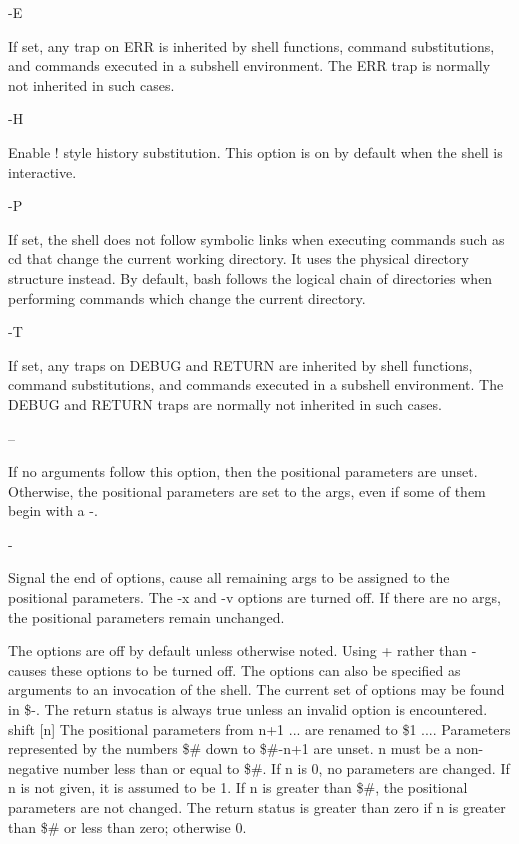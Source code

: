 -E

If set, any trap on ERR is inherited by shell functions, command substitutions, and commands executed in a subshell environment. The ERR trap is normally not inherited in such cases.

-H

Enable ! style history substitution. This option is on by default when the shell is interactive.

-P

If set, the shell does not follow symbolic links when executing commands such as cd that change the current working directory. It uses the physical directory structure instead. By default, bash follows the logical chain of directories when performing commands which change the current directory.

-T

If set, any traps on DEBUG and RETURN are inherited by shell functions, command substitutions, and commands executed in a subshell environment. The DEBUG and RETURN traps are normally not inherited in such cases.

--

If no arguments follow this option, then the positional parameters are unset. Otherwise, the positional parameters are set to the args, even if some of them begin with a -.

-

Signal the end of options, cause all remaining args to be assigned to the positional parameters. The -x and -v options are turned off. If there are no args, the positional parameters remain unchanged.

The options are off by default unless otherwise noted. Using + rather than - causes these options to be turned off. The options can also be specified as arguments to an invocation of the shell. The current set of options may be found in \$-. The return status is always true unless an invalid option is encountered.
shift [n]
The positional parameters from n+1 ... are renamed to \$1 .... Parameters represented by the numbers \$\# down to \$\#-n+1 are unset. n must be a non-negative number less than or equal to \$\#. If n is 0, no parameters are changed. If n is not given, it is assumed to be 1. If n is greater than \$\#, the positional parameters are not changed. The return status is greater than zero if n is greater than \$\# or less than zero; otherwise 0.

